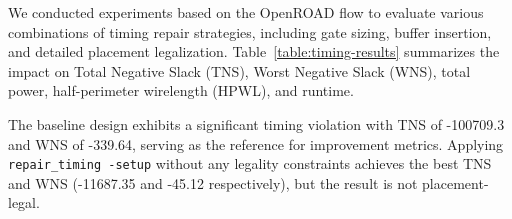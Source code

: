 \documentclass[conference]{IEEEtran}
\begin{document}
\begin{table}[htbp]
\caption{Comparison of Timing Repair Strategies}
\centering
{}
\label{table:timing-results}
\end{table}

We conducted experiments based on the OpenROAD\cite{OpenROAD} flow to evaluate various combinations of timing repair strategies, including gate sizing, buffer insertion, and detailed placement legalization. Table~\ref{table:timing-results} summarizes the impact on Total Negative Slack (TNS), Worst Negative Slack (WNS), total power, half-perimeter wirelength (HPWL), and runtime.

The baseline design exhibits a significant timing violation with TNS of -100709.3 and WNS of -339.64, serving as the reference for improvement metrics. Applying \texttt{repair\_timing -setup} without any legality constraints achieves the best TNS and WNS (-11687.35 and -45.12 respectively), but the result is not placement-legal.
\end{document}
